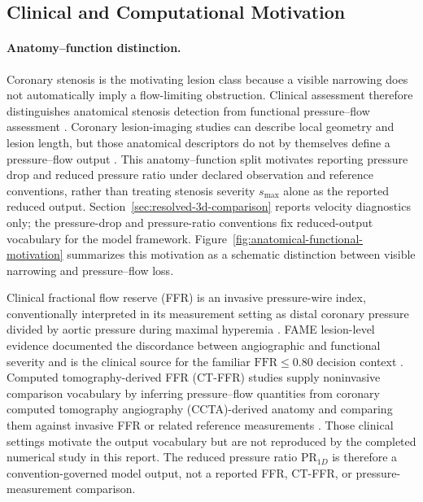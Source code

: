 \subsection{Clinical and Computational Motivation}
\label{subsec:pressure-flow-motivation}

\paragraph{Anatomy--function distinction.}
Coronary stenosis is the motivating lesion class because a visible narrowing
does not automatically imply a flow-limiting obstruction. Clinical assessment
therefore distinguishes anatomical stenosis detection from functional
pressure--flow assessment
\cite[p.~4401]{DerimayEtAl2021CoronaryStenosisObstruction}
\cite[Chs.~1--2 and~5]{EscanedDavies2017PhysiologicalAssessment}
\cite[Sec.~1]{ShaikhEtAl2025CTFFR}. Coronary lesion-imaging studies can
describe local geometry and lesion length, but those anatomical descriptors do
not by themselves define a pressure--flow output
\cite[Abstract; Methods]{VanDenHoogenEtAl2022CoronaryLesionCTA}. This
anatomy--function split motivates reporting pressure drop and reduced pressure
ratio under declared observation and reference conventions, rather than treating
stenosis severity $s_{\max}$ alone as the reported reduced output.
Section~\ref{sec:resolved-3d-comparison} reports velocity diagnostics only; the
pressure-drop and pressure-ratio conventions fix reduced-output vocabulary for
the model framework.
Figure~\ref{fig:anatomical-functional-motivation} summarizes this motivation
as a schematic distinction between visible narrowing and pressure--flow loss.

Clinical fractional flow reserve (FFR) is an invasive pressure-wire index,
conventionally interpreted in its measurement setting as distal coronary
pressure divided by aortic pressure during maximal hyperemia
\cite[Ch.~5, Sec.~5.5]{EscanedDavies2017PhysiologicalAssessment}
\cite[Abstract]{PijlsEtAl1996FFRFunctionalSeverity}. FAME lesion-level evidence
documented the discordance between angiographic and functional severity and is
the clinical source for the familiar $\mathrm{FFR}\le 0.80$ decision context
\cite[Abstract]{ToninoEtAl2010FAMEAngioFunctional}. Computed tomography-derived
FFR (CT-FFR) studies supply noninvasive comparison vocabulary by inferring
pressure--flow quantities from coronary computed tomography angiography
(CCTA)-derived anatomy and comparing them against invasive FFR or related
reference measurements
\cite[Abstract; Methods]{NorgaardEtAl2014NXTFFRCT}
\cite[Secs.~1.1--1.2]{ShaikhEtAl2025CTFFR}.
Those clinical settings motivate the output vocabulary but are not reproduced
by the completed numerical study in this report. The reduced pressure ratio
$\mathrm{PR}_{1D}$ is therefore a convention-governed model output, not a
reported FFR, CT-FFR, or pressure-measurement comparison.

